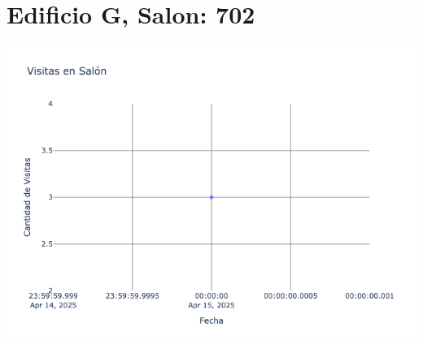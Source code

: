 \documentclass{article}
\begin{document}
    \section{Edificio G, Salon: 702}
    \noindent
    \begin{minipage}{0.48\textwidth}
        \centering
        \includegraphics[width=\textwidth]{../img/poli/VS702-180Dias-24-08-2025.png}
    \end{minipage}
    

    
\end{document}
